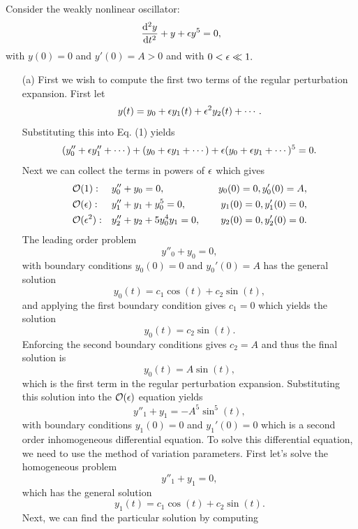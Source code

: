 \documentclass[12pt]{report}
\begin{document}
\begin{solution}

    \noindent
    Consider the weakly nonlinear oscillator:
    \begin{equation} \label{oscillator}
        \frac{\mathrm{d}^{2} y}{\mathrm{d} t^{2}} + y + {\epsilon} y^5 = 0,
    \end{equation} 
    with $y(0) = 0$ and $y'(0) = A > 0$ and with $0 < {\epsilon} \ll 1.$
    \begin{enumerate}
        \item [(a)]
        First we wish to compute the first two terms of the regular perturbation expansion. First let
        \[ 
            y(t) = y_0 + {\epsilon} y_1(t) + {\epsilon}^2 y_2(t) + \cdots.
        \] 
        Substituting this into Eq. (1) yields
        \[ 
            (y''_0 + {\epsilon} y''_1 + \cdots) + (y_0 + {\epsilon} y_1 + \cdots) + {\epsilon}(y_0 + {\epsilon} y_1 + \cdots)^5 = 0.
        \] 
        Next we can collect the terms in powers of ${\epsilon}$ which gives
        \begin{align*}
            &{\mathcal{O}}(1):      &&y''_0 + y_0 = 0,  &&&y_0(0) = 0, y'_0(0) = A,\\
            &{\mathcal{O}}({\epsilon}):   &&y''_1 + y_1 + y_0^5 = 0, &&&y_1(0) = 0, y'_1(0) = 0,\\
            &{\mathcal{O}}({\epsilon}^2): &&y''_2 + y_2 + 5y_0^4y_1 = 0,  &&&y_2(0) = 0, y_2'(0) = 0.
        \end{align*}  
        The leading order problem
        \[ 
            y''_0 + y_0 = 0,
        \]
        with boundary conditions $y_0(0) = 0$ and $y_0'(0) = A$ has the general solution 
        \[ 
            y_0(t) = c_1 \cos(t) + c_2\sin(t),
        \]
        and applying the first boundary condition gives $c_1 =0$ which yields the solution 
        \[ 
            y_0(t) = c_2\sin(t).
        \]
        Enforcing the second boundary conditions gives $c_2 = A$ and thus the final solution is 
        \[ 
            y_0(t) = A\sin(t),
        \]
        which is the first term in the regular perturbation expansion. Substituting this solution into the ${\mathcal{O}}({\epsilon})$ equation yields
        \[ 
            y''_1 + y_1 = -A^5\sin^5(t),
        \]
        with boundary conditions $y_1(0) = 0$ and $y_1'(0)=0$ which is a second order inhomogeneous differential equation. To solve this differential equation, we need to use the method of variation parameters. First let's solve the homogeneous problem
        \[ 
            y''_1 + y_1 = 0,
        \]
        which has the general solution 
        \[ 
            y_1(t) = c_1\cos(t) + c_2\sin(t).
        \]
        Next, we can find the particular solution by computing

\end{enumerate}
\end{solution}
\end{document}
